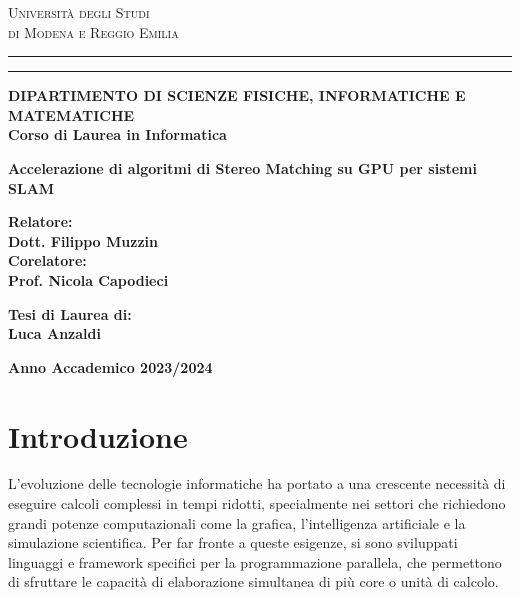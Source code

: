 \documentclass[12pt,a4paper]{report}
\begin{document}
\begin{titlepage}
\begin{center}
{{\Large{\textsc{Università degli Studi \\ \vspace{2mm} di Modena e Reggio Emilia}}}} \rule[0.1cm]{14cm}{0.1mm}
\rule[0.5cm]{14cm}{0.6mm}
{\small{\bf DIPARTIMENTO DI SCIENZE FISICHE, INFORMATICHE E MATEMATICHE\\
Corso di Laurea in Informatica}}

\end{center}
\vspace{20mm}
\begin{center}
{\LARGE{\bf Accelerazione di algoritmi di Stereo Matching su GPU per sistemi SLAM  }}\\
\vspace{3mm}
\end{center}
\vspace{40mm}
\par
\noindent
\begin{minipage}[t]{0.47\textwidth}
{\large{\bf Relatore:\\Dott. Filippo Muzzin}} \\
{\large{\bf Corelatore:\\Prof. Nicola Capodieci}}
\end{minipage}
\hfill
\begin{minipage}[t]{0.47\textwidth}\raggedleft
{\large{\bf Tesi di Laurea di:\\
Luca Anzaldi}}
\end{minipage}
\vspace{20mm}
\begin{center}
{\large{\bf Anno Accademico 2023/2024}}
\end{center}
\end{titlepage}

\tableofcontents

\chapter{Introduzione}

L’evoluzione delle tecnologie informatiche ha portato a una crescente necessità di eseguire calcoli complessi in tempi ridotti, specialmente nei settori che richiedono grandi potenze computazionali come la grafica, l'intelligenza artificiale e la simulazione scientifica. Per far fronte a queste esigenze, si sono sviluppati linguaggi e framework specifici per la programmazione parallela, che permettono di sfruttare le capacità di elaborazione simultanea di più core o unità di calcolo.
\end{document}
